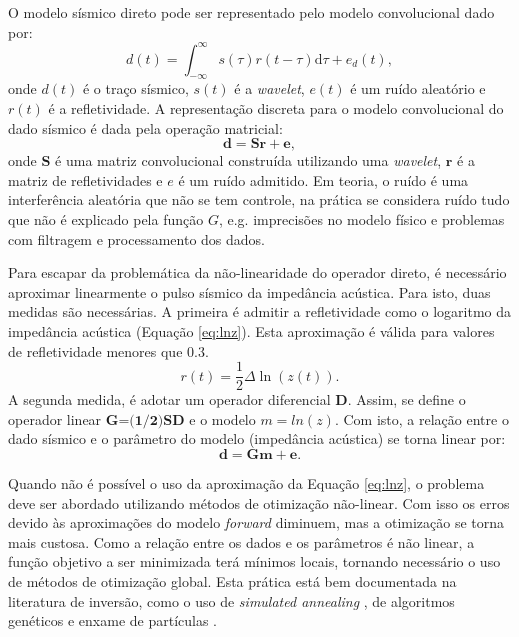 O modelo sísmico direto pode ser representado pelo modelo convolucional dado por:
\begin{equation}
d(t) = \int_{-\infty}^{\infty} s(\tau) r(t - \tau)\mathrm{d}\tau + e_{d}(t),
\label{eq:conmodel}
\end{equation}
onde $d(t)$ é o traço sísmico, $s(t)$ é a \textit{wavelet}, $e(t)$ é
um ruído aleatório e $r(t)$ é a refletividade.
A representação discreta para o modelo convolucional do dado sísmico é
dada pela operação matricial: 
\begin{equation}
\label{eq:sismDiscreta}
\mathbf{d = Sr + e},
\end{equation}
onde $\mathbf{S}$ é uma matriz convolucional construída utilizando uma
\textit{wavelet}, $\mathbf{r}$ é a matriz de refletividades e $e$ é um
ruído admitido. Em teoria, o ruído é uma interferência aleatória que não se tem
controle, na prática se considera ruído tudo que não é explicado pela função
$G$, e.g. imprecisões no modelo físico e problemas com filtragem e processamento
dos dados.

Para escapar da problemática da não-linearidade do operador direto, é
necessário aproximar linearmente o pulso sísmico da impedância acústica.
Para isto, duas medidas são necessárias. A primeira é admitir a 
refletividade como o logaritmo da impedância acústica (Equação \ref{eq:lnz}).
Esta aproximação é válida para valores de refletividade menores que $0.3$.
\begin{equation}
r(t) = \frac{1}{2}\Delta \ln(z(t)).
\label{eq:lnz}
\end{equation}
A segunda medida, é adotar um operador diferencial $\textbf{D}$. Assim,
se define o operador linear $\textbf{G=(1/2)SD}$ e o modelo $m=ln(z)$.
Com isto, a relação entre o dado sísmico e o parâmetro do modelo (impedância acústica)
se torna linear por:
\begin{equation}
\label{eq:sismDiscreta2}
\mathbf{d = Gm + e}.
\end{equation}

Quando não é possível o uso da aproximação da Equação \ref{eq:lnz}, o problema
deve ser abordado utilizando métodos de otimização não-linear. Com isso os erros
devido às aproximações do modelo \textit{forward} diminuem, mas a otimização se
torna mais custosa. Como a relação entre os dados e os parâmetros é não linear, a
função objetivo a ser minimizada terá mínimos locais, tornando necessário
o uso de métodos de otimização global. Esta prática está bem documentada na
literatura de inversão, como o uso de \textit{simulated annealing}
\citep{max_inv_simulated}, de algoritmos genéticos \citep{MallickGeneticInve} e
enxame de partículas \citep{zhe_nonlinear}. 

